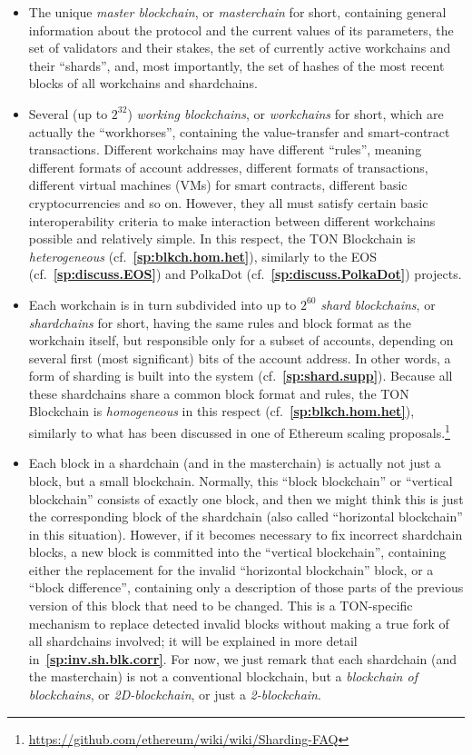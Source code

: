 \documentclass[12pt,oneside]{article}
\def\refpoint#1{{\rm\textbf{\ref{#1}}}}
\let\ptref=\refpoint
\begin{document}
\begin{itemize}
\item The unique {\em master blockchain}, or {\em masterchain\/} for
  short, containing general information about the protocol and the
  current values of its parameters, the set of validators and their
  stakes, the set of currently active workchains and their ``shards'',
  and, most importantly, the set of hashes of the most recent blocks
  of all workchains and shardchains.
\item Several (up to $2^{32}$) {\em working blockchains}, or {\em
  workchains\/} for short, which are actually the ``workhorses'',
  containing the value-transfer and smart-contract
  transactions. Different workchains may have different ``rules'',
  meaning different formats of account addresses, different formats of
  transactions, different virtual machines (VMs) for smart contracts,
  different basic cryptocurrencies and so on. However, they all must
  satisfy certain basic interoperability criteria to make interaction
  between different work\-chains possible and relatively simple. In
  this respect, the TON Blockchain is {\em heterogeneous\/}
  (cf.~\ptref{sp:blkch.hom.het}), similarly to the EOS
  (cf.~\ptref{sp:discuss.EOS}) and PolkaDot
  (cf.~\ptref{sp:discuss.PolkaDot}) projects.
\item Each workchain is in turn subdivided into up to $2^{60}$ {\em
  shard blockchains}, or {\em shardchains\/} for short, having the
  same rules and block format as the workchain itself, but responsible
  only for a subset of accounts, depending on several first (most
  significant) bits of the account address. In other words, a form of
  sharding is built into the system
  (cf.~\ptref{sp:shard.supp}). Because all these shardchains share a
  common block format and rules, the TON Blockchain is {\em
    homogeneous\/} in this respect (cf.~\ptref{sp:blkch.hom.het}),
  similarly to what has been discussed in one of Ethereum scaling
  proposals.\footnote{\url{https://github.com/ethereum/wiki/wiki/Sharding-FAQ}}
\item Each block in a shardchain (and in the masterchain) is actually
  not just a block, but a small blockchain. Normally, this ``block
  blockchain'' or ``vertical blockchain'' consists of exactly one
  block, and then we might think this is just the corresponding block
  of the shardchain (also called ``horizontal block\-chain'' in this
  situation). However, if it becomes necessary to fix incorrect
  shardchain blocks, a new block is committed into the ``vertical
  block\-chain'', containing either the replacement for the invalid
  ``horizontal blockchain'' block, or a ``block difference'',
  containing only a description of those parts of the previous version
  of this block that need to be changed. This is a TON-specific
  mechanism to replace detected invalid blocks without making a true
  fork of all shardchains involved; it will be explained in more
  detail in~\ptref{sp:inv.sh.blk.corr}. For now, we just remark that
  each shardchain (and the masterchain) is not a conventional
  blockchain, but a {\em blockchain of blockchains}, or {\em
    2D-blockchain}, or just a {\em 2-blockchain}.
\end{itemize}
\end{document}
